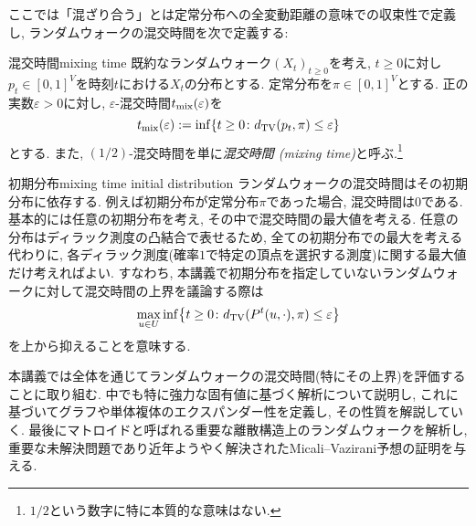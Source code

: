ここでは「混ざり合う」とは定常分布への全変動距離の意味での収束性で定義し,
ランダムウォークの混交時間を次で定義する:
\begin{definition}{混交時間}{mixing time}
  既約なランダムウォーク$(X_t)_{t\ge 0}$を考え, $t\ge 0$に対し
  $p_t \in [0,1]^V$を時刻$t$における$X_t$の分布とする.
  定常分布を$\pi \in [0,1]^V$とする.
  正の実数$\varepsilon > 0$に対し, $\varepsilon$-混交時間$t_{\mathrm{mix}}(\varepsilon)$を
  \[
    \tmix(\varepsilon) \defeq \inf\cbra*{ t \ge 0 \colon \dtv(p_t, \pi) \le \varepsilon}
  \]
  とする.
  また, $(1/2)$-混交時間を単に\emph{混交時間 (mixing time)}と呼ぶ.\footnote{$1/2$という数字に特に本質的な意味はない.}
\end{definition}
\begin{remark}{初期分布}{mixing time initial distribution}
  ランダムウォークの混交時間はその初期分布に依存する.
  例えば初期分布が定常分布$\pi$であった場合, 混交時間は$0$である.
  基本的には任意の初期分布を考え, その中で混交時間の最大値を考える.
  任意の分布はディラック測度の凸結合で表せるため,
  全ての初期分布での最大を考える代わりに,
  各ディラック測度(確率$1$で特定の頂点を選択する測度)に関する最大値だけ考えればよい.
  すなわち, 本講義で初期分布を指定していないランダムウォークに対して混交時間の上界を議論する際は
  \[
    \max_{u\in U} \inf\cbra*{ t\ge 0 \colon \dtv(P^t(u,\cdot),\pi) \le \varepsilon }
  \]
  を上から抑えることを意味する.
\end{remark}

本講義では全体を通じてランダムウォークの混交時間(特にその上界)を評価することに取り組む.
中でも特に強力な固有値に基づく解析について説明し,
これに基づいてグラフや単体複体のエクスパンダー性を定義し, その性質を解説していく.
最後にマトロイドと呼ばれる重要な離散構造上のランダムウォークを解析し,
重要な未解決問題であり近年ようやく解決されたMicali--Vazirani予想の証明を与える.

